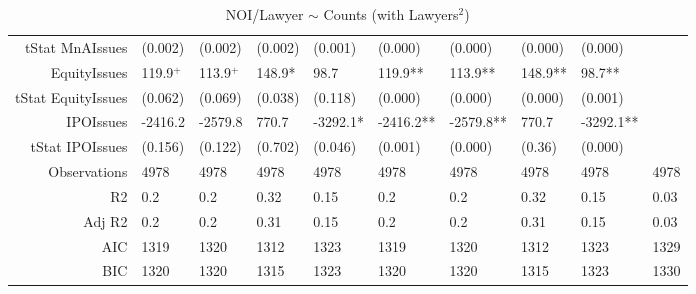 \begin{table}[ht]
\begin{tabular}{rlllllllll}
  tStat MnAIssues & (0.002) & (0.002) & (0.002) & (0.001) & (0.000) & (0.000) & (0.000) & (0.000) &  \\ 
  EquityIssues & 119.9$^{+}$ & 113.9$^{+}$ & 148.9* & 98.7 & 119.9** & 113.9** & 148.9** & 98.7** &  \\ 
  tStat EquityIssues & (0.062) & (0.069) & (0.038) & (0.118) & (0.000) & (0.000) & (0.000) & (0.001) &  \\ 
  IPOIssues & -2416.2 & -2579.8 & 770.7 & -3292.1* & -2416.2** & -2579.8** & 770.7 & -3292.1** &  \\ 
  tStat IPOIssues & (0.156) & (0.122) & (0.702) & (0.046) & (0.001) & (0.000) & (0.36) & (0.000) &  \\ 
  Observations & 4978 & 4978 & 4978 & 4978 & 4978 & 4978 & 4978 & 4978 & 4978 \\ 
  R2 & 0.2 & 0.2 & 0.32 & 0.15 & 0.2 & 0.2 & 0.32 & 0.15 & 0.03 \\ 
  Adj R2 & 0.2 & 0.2 & 0.31 & 0.15 & 0.2 & 0.2 & 0.31 & 0.15 & 0.03 \\ 
  AIC & 1319 & 1320 & 1312 & 1323 & 1319 & 1320 & 1312 & 1323 & 1329 \\ 
  BIC & 1320 & 1320 & 1315 & 1323 & 1320 & 1320 & 1315 & 1323 & 1330 \\ 
   \hline
\end{tabular}
\caption{NOI/Lawyer $\sim$ Counts (with Lawyers$^2$)} 
\end{table}
